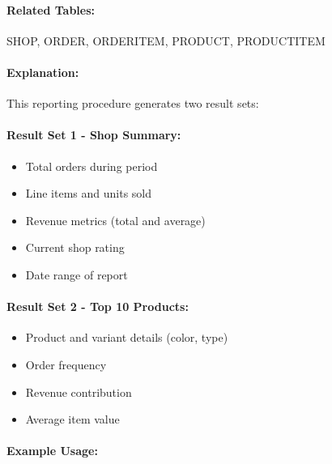 \paragraph{Related Tables:} SHOP, ORDER, ORDERITEM, PRODUCT, PRODUCTITEM

\paragraph{Explanation:}
This reporting procedure generates two result sets:

\paragraph{Result Set 1 - Shop Summary:}
\begin{itemize}
    \item Total orders during period
    \item Line items and units sold
    \item Revenue metrics (total and average)
    \item Current shop rating
    \item Date range of report
\end{itemize}

\paragraph{Result Set 2 - Top 10 Products:}
\begin{itemize}
    \item Product and variant details (color, type)
    \item Order frequency
    \item Revenue contribution
    \item Average item value
\end{itemize}

\paragraph{Example Usage:}

